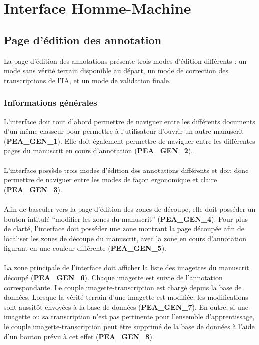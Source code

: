 \section{Interface Homme-Machine}

\subsection{Page d'édition des annotation}

La page d’édition des annotations présente trois modes d’édition différents :
un mode sans vérité terrain disponible au départ, un mode de correction des
transcriptions de l’IA, et un mode de validation finale.

\subsubsection{Informations générales}

L’interface doit tout d’abord permettre de naviguer entre les différents
documents d’un même classeur pour permettre à l’utilisateur d’ouvrir un autre
manuscrit (\textbf{PEA\_GEN\_1}). Elle doit également permettre de naviguer
entre les différentes pages du manuscrit en cours d’annotation
(\textbf{PEA\_GEN\_2}).

\paragraph{}
L’interface possède trois modes d’édition des annotations différents et doit
donc permettre de naviguer entre les modes de façon ergonomique et claire
(\textbf{PEA\_GEN\_3}).

\paragraph{}
Afin de basculer vers la page d’édition des zones de découpe, elle doit
posséder un bouton intitulé “modifier les zones du manuscrit”
(\textbf{PEA\_GEN\_4}). Pour plus de clarté, l’interface doit posséder une zone
montrant la page découpée afin de localiser les zones de découpe du manuscrit,
avec la zone en cours d’annotation figurant en une couleur différente
(\textbf{PEA\_GEN\_5}).

\paragraph{}
La zone principale de l’interface doit afficher la liste des imagettes du
manuscrit découpé (\textbf{PEA\_GEN\_6}). Chaque imagette est suivie de
l’annotation correspondante. Le couple imagette-transcription est chargé
depuis la base de données. Lorsque la vérité-terrain d’une imagette est
modifiée, les modifications sont aussitôt envoyées à la base de données
(\textbf{PEA\_GEN\_7}). En outre, si une imagette ou sa transcription n’est
pas pertinente pour l’ensemble d’apprentissage, le couple
imagette-transcription peut être supprimé de la base de données à l’aide d’un
bouton prévu à cet effet (\textbf{PEA\_GEN\_8}).

